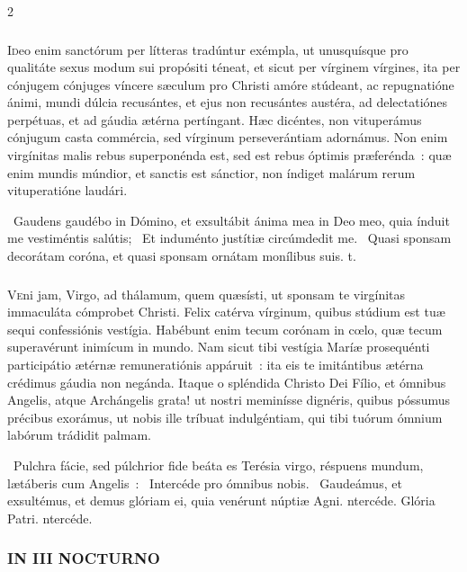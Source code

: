 \documentclass[9pt,twoside]{extarticle}
\begin{document}
\begin{multicols}{2}
\subsubsection*{\center \normalfont {}}
\lettrine{I}deo enim sanctórum per lítteras tradúntur exémpla, ut unusquísque pro qualitáte sexus modum sui propósiti téneat, et sicut per vírginem vírgines, ita per cónjugem cónjuges víncere sæculum pro Christi amóre stúdeant, ac repugnatióne ánimi, mundi dúlcia recusántes, et ejus non recusántes austéra, ad delectatiónes perpétuas, et ad gáudia ætérna pertíngant. Hæc dicéntes, non vituperámus cónjugum casta commércia, sed vírginum perseverántiam adornámus. Non enim virgínitas malis rebus superponénda est, sed est rebus óptimis præferénda~: quæ enim mundis múndior, et sanctis est sánctior, non índiget malárum rerum vituperatióne laudári.

~Gaudens gaudébo in Dómino, et exsultábit ánima mea in Deo meo, quia índuit me vestiméntis salútis; \textred{*}~Et induménto justítiæ circúmdedit me. ~Quasi sponsam decorátam coróna, et quasi sponsam ornátam monílibus suis. t.

\subsubsection*{\center \normalfont {}}
\lettrine{V}eni jam, Virgo, ad thálamum, quem quæsísti, ut sponsam te virgínitas immaculáta cómprobet Christi. Felix catérva vírginum, quibus stúdium est tuæ sequi confessiónis vestígia. Habébunt enim tecum corónam in cœlo, quæ tecum superavérunt inimícum in mundo. Nam sicut tibi vestígia Maríæ prosequénti participátio ætérnæ remuneratiónis appáruit~: ita eis te imitántibus ætérna crédimus gáudia non negánda. Itaque o spléndida Christo Dei Fílio, et ómnibus Angelis, atque Archángelis grata! ut nostri meminísse dignéris, quibus póssumus précibus exorámus, ut nobis ille tríbuat indulgéntiam, qui tibi tuórum ómnium labórum trádidit palmam. 

~Pulchra fácie, sed púlchrior fide beáta es Terésia virgo, réspuens mundum, lætáberis cum Angelis~: \textred{*}~Intercéde pro ómnibus nobis. ~Gaudeámus, et exsultémus, et demus glóriam ei, quia venérunt núptiæ Agni. ntercéde. Glória Patri. ntercéde.

\subsubsection*{\center \normalfont \small \textsc{IN III NOCTURNO}}

\end{multicols}
\end{document}
